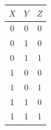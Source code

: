 \documentclass[11pt]{article}
\begin{document}
    \begin{table}[h!]
        \centering
        \begin{tabular}{|c c|c|}
        \hline
        $X$ & $Y$ & $Z$ \\
        \hline
        0 & 0 & 0  \\
        0 & 1 & 0  \\
        0 & 1 & 1  \\
        1 & 0 & 0  \\
        1 & 0 & 1  \\
        1 & 1 & 0  \\
        1 & 1 & 1  \\
        \hline
        \end{tabular}
        \label{tab:tb}
    \end{table}
\end{document}
